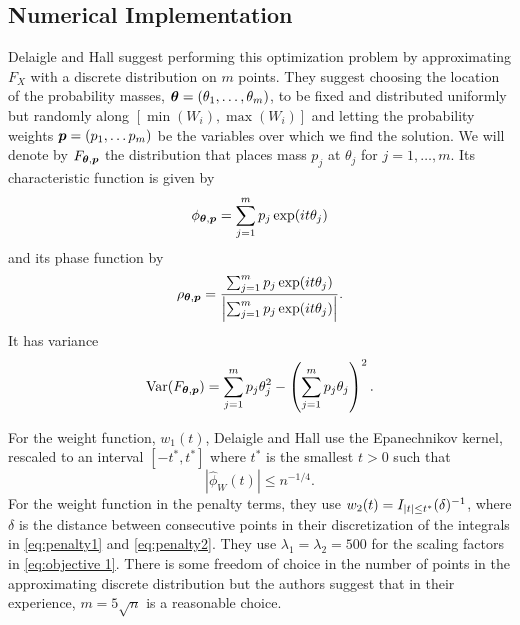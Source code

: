 	

	

	\subsection{Numerical Implementation}

	Delaigle and Hall suggest performing this optimization problem by approximating $F_X$ with a discrete distribution on $m$ points. They suggest choosing the location of the probability masses, ${\bm{{\theta}}} = (\theta_1, \dots, \theta_m)$, to be fixed and distributed uniformly but randomly along $[\min(W_i), \max(W_i)]$ and letting the probability weights ${\bm{{p}}} = (p_1, \dots p_m)$ be the variables over which we find the solution. We will denote by $F_{{\bm{{\theta}}}, {\bm{{p}}}}$ the distribution that places mass $p_j$ at $\theta_j$ for $j = 1,\dots, m$. Its characteristic function is given by
	\begin{equation}
		\phi_{{\bm{{\theta}}}, {\bm{{p}}}} = \sum_{j = 1}^m p_j \exp(it\theta_j)
	\end{equation}
	and its phase function by
	\begin{equation}
		\rho_{{\bm{{\theta}}}, {\bm{{p}}}} = \frac{ \sum_{j = 1}^m p_j \exp(it\theta_j)}{\left| \sum_{j = 1}^m p_j \exp(it\theta_j)\right|}.
	\end{equation}
	It has variance
	\begin{equation}
		\mathrm{Var}(F_{{\bm{{\theta}}}, {\bm{{p}}}}) = \sum_{j = 1}^m p_j \theta_j^2 - \left( \sum_{j=1}^m p_j \theta_j \right)^2.
	\end{equation}

	For the weight function, $w_1(t)$, Delaigle and Hall use the Epanechnikov kernel, rescaled to an interval $[-t^*, t^*]$ where $t^*$ is the smallest $t > 0$ such that 
	\begin{equation}
	\label{eq:define t star}
		\left|\hat{\phi}_W(t)\right| \leq n^{-1/4}.
	\end{equation}
	For the weight function in the penalty terms, they use $w_2(t) = I_{|t| \leq t^*} (\delta)^{-1}$, where $\delta$ is the distance between consecutive points in their discretization of the integrals in \eqref{eq:penalty1} and \eqref{eq:penalty2}. They use $\lambda_1 = \lambda_2 = 500$ for the scaling factors in \eqref{eq:objective 1}.
	There is some freedom of choice in the number of points in the approximating discrete distribution but the authors suggest that in their experience, $m = 5\sqrt{n}$ is a reasonable choice.


